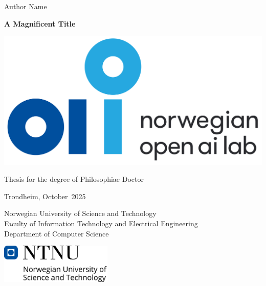 \frontmatter
{
\sffamily
\parindent=0cm
\renewcommand{\headrulewidth}{0pt}
\addtolength{\parskip}{\baselineskip}
{\huge {Author Name}}
\vspace{2cm}

{\textbf {\fontsize{27}{32}\selectfont A Magnificent Title}}

{\LARGE }
\vspace{4.5cm}

{\includegraphics[scale=0.2]{images/NAIL.png}}

{\Large Thesis for the degree of Philosophiae Doctor

Trondheim, October\ 2025

Norwegian University of Science and Technology \\[0.6ex]
Faculty of Information Technology and Electrical Engineering \\[0.6ex]
Department of Computer Science}
\vfill

\includegraphics[width=0.4\textwidth]{images/NTNUStaaende.pdf}

\newpage
}